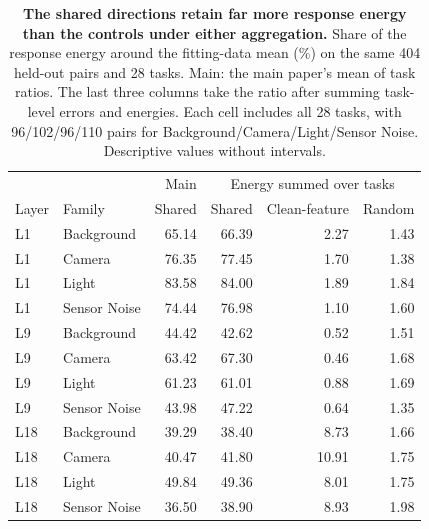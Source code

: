 \begin{table}[h]
\centering\small
\setlength{\tabcolsep}{5pt}
\begin{tabular}{llrrrr}
\toprule
& & Main & \multicolumn{3}{c}{Energy summed over tasks}\\
Layer & Family & Shared & Shared & Clean-feature & Random\\
\midrule
L1 & Background & 65.14 & 66.39 & 2.27 & 1.43 \\
L1 & Camera & 76.35 & 77.45 & 1.70 & 1.38 \\
L1 & Light & 83.58 & 84.00 & 1.89 & 1.84 \\
L1 & Sensor Noise & 74.44 & 76.98 & 1.10 & 1.60 \\
\midrule
L9 & Background & 44.42 & 42.62 & 0.52 & 1.51 \\
L9 & Camera & 63.42 & 67.30 & 0.46 & 1.68 \\
L9 & Light & 61.23 & 61.01 & 0.88 & 1.69 \\
L9 & Sensor Noise & 43.98 & 47.22 & 0.64 & 1.35 \\
\midrule
L18 & Background & 39.29 & 38.40 & 8.73 & 1.66 \\
L18 & Camera & 40.47 & 41.80 & 10.91 & 1.75 \\
L18 & Light & 49.84 & 49.36 & 8.01 & 1.75 \\
L18 & Sensor Noise & 36.50 & 38.90 & 8.93 & 1.98 \\
\bottomrule
\end{tabular}
\caption{\textbf{The shared directions retain far more response energy than the controls under either aggregation.} Share of the response energy around the fitting-data mean (\%) on the same 404 held-out pairs and 28 tasks. Main: the main paper's mean of task ratios. The last three columns take the ratio after summing task-level errors and energies. Each cell includes all 28 tasks, with 96/102/96/110 pairs for Background/Camera/Light/Sensor Noise. Descriptive values without intervals.}
\label{tab:supp-energy-aggregation}
\end{table}
